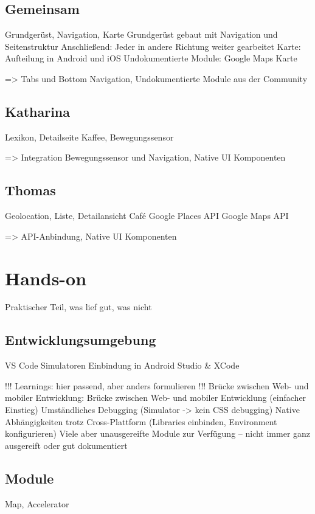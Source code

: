 \subsection{Gemeinsam}
Grundgerüst, Navigation, Karte
Grundgerüst gebaut mit Navigation und Seitenstruktur
Anschließend: Jeder in andere Richtung weiter gearbeitet
Karte: Aufteilung in Android und iOS
Undokumentierte Module: Google Maps Karte

=> Tabs und Bottom Navigation, Undokumentierte Module aus der Community


\subsection{Katharina}
Lexikon, Detailseite Kaffee, Bewegungssensor

=> Integration Bewegungssensor und Navigation, Native UI Komponenten

\subsection{Thomas}
Geolocation, Liste, Detailansicht Café
Google Places API
Google Maps API

=> API-Anbindung, Native UI Komponenten



\section{Hands-on}
Praktischer Teil, was lief gut, was nicht

\subsection{Entwicklungsumgebung}
VS Code
Simulatoren
Einbindung in Android Studio \& XCode



!!! Learnings: hier passend, aber anders formulieren !!!
Brücke zwischen Web- und mobiler Entwicklung: Brücke zwischen Web- und mobiler Entwicklung (einfacher Einstieg)
Umständliches Debugging (Simulator -> kein CSS debugging)
Native Abhängigkeiten trotz Cross-Plattform (Libraries einbinden, Environment konfigurieren)
Viele aber unausgereifte Module zur Verfügung – nicht immer ganz ausgereift oder gut dokumentiert


\subsection{Module}
Map, Accelerator



